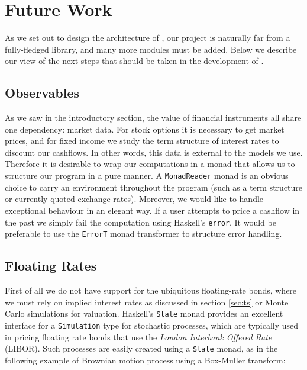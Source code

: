 \chapter{Future Work}

As we set out to design the architecture of \hql\hspace{-0.05cm}, our 
project is naturally far 
from a fully-fledged library, and many more modules must be added. Below we
describe our view of the next steps that should be taken in the development
of \hql.

\section{Observables}

As we saw in the introductory section, the value of financial instruments
all share one dependency: market data. For stock options it is necessary 
to get market prices, and for fixed income we study the term structure of
interest rates to discount our cashflows. In other words, this data is 
external to the models we use.\\

Therefore it is desirable to wrap our computations in a monad that allows us
to structure our program in a pure manner. A \texttt{MonadReader} monad is an obvious
choice to carry an environment throughout the program (such as a term structure or
currently quoted exchange rates). Moreover, we would like \hql to handle exceptional
behaviour in an elegant way. If a user attempts to price a cashflow in the past we 
simply fail the computation using Haskell's \texttt{error}. It would be preferable 
to use the \texttt{ErrorT} monad transformer to structure error handling.

\section{Floating Rates}

First of all we do not have support for the ubiquitous floating-rate bonds, 
where we must rely on implied interest rates as discussed in section \ref{sec:ts}
or Monte Carlo simulations for valuation. Haskell's 
\texttt{State} monad provides an excellent interface for a \texttt{Simulation}
type for stochastic processes, which are typically used in pricing floating
rate bonds that use the \emph{London Interbank Offered Rate} (LIBOR). Such
processes are easily created using a \texttt{State} monad, as in the following
example of Brownian motion process using a Box-Muller transform:

